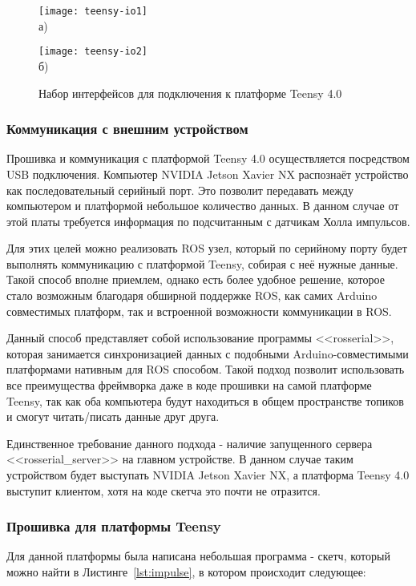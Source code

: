 \begin{figure}[ht]
    \begin{minipage}[b][][b]{0.49\linewidth}\centering
        \texttt{[image: teensy-io1]} \\ а)
    \end{minipage}
    \hfill
    \begin{minipage}[b][][b]{0.49\linewidth}\centering
        \texttt{[image: teensy-io2]} \\ б)
    \end{minipage}
    \caption{Набор интерфейсов для подключения к платформе Teensy 4.0}
    \label{fig:teensy-io}
\end{figure}

\subsubsection{Коммуникация с внешним устройством}
Прошивка и коммуникация с платформой Teensy 4.0 осуществляется посредством USB подключения. Компьютер NVIDIA Jetson Xavier NX распознаёт устройство как последовательный серийный порт. Это позволит передавать между компьютером и платформой небольшое количество данных. В данном случае от этой платы требуется информация по подсчитанным с датчикам Холла импульсов. 

Для этих целей можно реализовать ROS узел, который по серийному порту будет выполнять коммуникацию с платформой Teensy, собирая с неё нужные данные. Такой способ вполне приемлем, однако есть более удобное решение, которое стало возможным благодаря обширной поддержке ROS, как самих Arduino совместимых платформ, так и встроенной возможности коммуникации в ROS. 

Данный способ представляет собой использование программы <<rosserial>>, которая занимается синхронизацией данных с подобными Arduino-совместимыми платформами нативным для ROS способом. Такой подход позволит использовать все преимущества фреймворка даже в коде прошивки на самой платформе Teensy, так как оба компьютера будут находиться в общем пространстве топиков и смогут читать/писать данные друг друга.

Единственное требование данного подхода - наличие запущенного сервера <<rosserial\_server>> на главном устройстве. В данном случае таким устройством будет выступать NVIDIA Jetson Xavier NX, а платформа Teensy 4.0 выступит клиентом, хотя на коде скетча это почти не отразится.

\subsubsection{Прошивка для платформы Teensy}
Для данной платформы была написана небольшая программа - скетч, который можно найти в Листинге~\cref{lst:impulse}, в котором происходит следующее:

